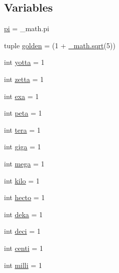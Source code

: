 \subsection*{Variables}
\begin{DoxyCompactItemize}
\item 
\hyperlink{namespacescipy_1_1constants_1_1constants_a0dbffed0c49b0883ca0dba1aca0aca40}{pi} = \+\_\+math.\+pi
\item 
tuple \hyperlink{namespacescipy_1_1constants_1_1constants_a241758c9149daabc1492b62c3df4788d}{golden} = (1 + \hyperlink{vecuops_8cc_ac9f82fdb8cd289615247f897852ee5f2}{\+\_\+math.\+sqrt}(5))
\item 
int \hyperlink{namespacescipy_1_1constants_1_1constants_a57cb9021147e160e6f47b41860ada942}{yotta} = 1
\item 
int \hyperlink{namespacescipy_1_1constants_1_1constants_a92bd42279bec2bdf5015d9349db7e4da}{zetta} = 1
\item 
int \hyperlink{namespacescipy_1_1constants_1_1constants_a866e78cd72fdcc0db03e230d61ff7886}{exa} = 1
\item 
int \hyperlink{namespacescipy_1_1constants_1_1constants_a85535c0aa0e20e096af3ef6cfaf77b7a}{peta} = 1
\item 
int \hyperlink{namespacescipy_1_1constants_1_1constants_a4d9a11844421eb4f1d794ac88933715f}{tera} = 1
\item 
int \hyperlink{namespacescipy_1_1constants_1_1constants_aea1d2f25fbd4fd26779667ea86c11244}{giga} = 1
\item 
int \hyperlink{namespacescipy_1_1constants_1_1constants_a23baaf21a99a8724871294b964fb99e3}{mega} = 1
\item 
int \hyperlink{namespacescipy_1_1constants_1_1constants_a67a5ac2892090bbb500947143604da4b}{kilo} = 1
\item 
int \hyperlink{namespacescipy_1_1constants_1_1constants_adf23dd04ca26390e8ad3df410210e4c3}{hecto} = 1
\item 
int \hyperlink{namespacescipy_1_1constants_1_1constants_ab4474d292807aa34f894835a146dd622}{deka} = 1
\item 
int \hyperlink{namespacescipy_1_1constants_1_1constants_a3610b6a0884678aab8826a67a26fb4e9}{deci} = 1
\item 
int \hyperlink{namespacescipy_1_1constants_1_1constants_a169c1cdaa4bf3dfaeb55bef408e6df82}{centi} = 1
\item 
int \hyperlink{namespacescipy_1_1constants_1_1constants_a8a91b7048b45818813e47e7b093242a3}{milli} = 1
\item 

\end{DoxyCompactItemize}
